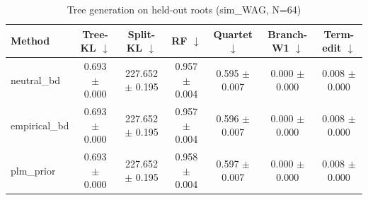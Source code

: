 \begin{table}[t]\centering
\caption{Tree generation on held-out roots (sim_WAG, N=64)}
\begin{tabular}{lcccccc}
\toprule
Method & Tree-KL $\downarrow$ & Split-KL $\downarrow$ & RF $\downarrow$ & Quartet $\downarrow$ & Branch-W1 $\downarrow$ & Term-edit $\downarrow$ \\
\midrule
neutral\_bd & 0.693 $\pm$ 0.000 & 227.652 $\pm$ 0.195 & 0.957 $\pm$ 0.004 & 0.595 $\pm$ 0.007 & 0.000 $\pm$ 0.000 & 0.008 $\pm$ 0.000 \\
empirical\_bd & 0.693 $\pm$ 0.000 & 227.652 $\pm$ 0.195 & 0.957 $\pm$ 0.004 & 0.596 $\pm$ 0.007 & 0.000 $\pm$ 0.000 & 0.008 $\pm$ 0.000 \\
plm\_prior & 0.693 $\pm$ 0.000 & 227.652 $\pm$ 0.195 & 0.958 $\pm$ 0.004 & 0.597 $\pm$ 0.007 & 0.000 $\pm$ 0.000 & 0.008 $\pm$ 0.000 \\
\bottomrule
\end{tabular}
\end{table}